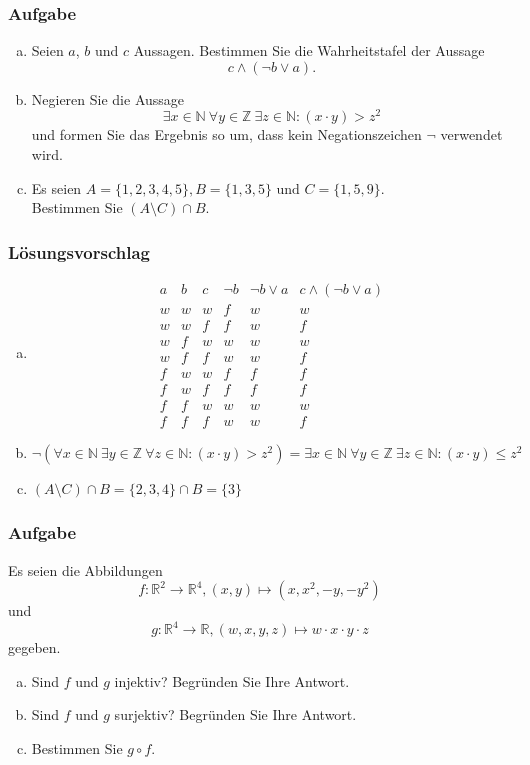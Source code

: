 \documentclass[a4paper,11pt]{scrartcl}
\newcounter{auf}
\newcommand{\Aufgabe}%
        {\addtocounter{auf}{1} \subsubsection*{\rmfamily  Aufgabe \theauf \hspace{1em}} }
\newcommand{\N}{\mathbb{N}}
\newcommand{\RR}{\mathbb{R}}
\newcommand{\Z}{\mathbb{Z}}
\begin{document}
\Aufgabe

\begin{enumerate}[a)]

\item Seien $a$, $b$ und $c$  Aussagen. 
Bestimmen Sie die Wahrheitstafel der Aussage
$$
	c \land (\neg b \lor a).
$$
\item Negieren Sie die Aussage 
$$
\exists x \in \N\ \forall y \in \Z\ \exists z \in \N: (x\cdot y) > z^2
$$
und formen Sie das Ergebnis so um, dass kein Negationszeichen $\neg$ verwendet wird.
\item Es seien $A=\{1,2,3,4,5\}, B=\{1,3,5\} \text{ und } C=\{1,5,9\}.$\\
Bestimmen Sie $(A\setminus C)\cap B$.
\end{enumerate}
%
%
\subsubsection*{Lösungsvorschlag}
\begin{enumerate}[a)]

\item $$\begin{array}{c|c|c||c|c||c}
a&b&c&\neg b&\neg b\lor a&c\land(\neg b\lor a)\\ \hline
w&w&w&f&w&w\\
w&w&f&f&w&f\\
w&f&w&w&w&w\\
w&f&f&w&w&f\\
f&w&w&f&f&f\\
f&w&f&f&f&f\\
f&f&w&w&w&w\\
f&f&f&w&w&f
\end{array}$$
\item $\neg(\forall x \in \N\ \exists y \in \Z\ \forall z \in \N: (x\cdot y) > z^2) = \exists x \in \N \ \forall y \in \Z \ \exists z \in \N: (x \cdot y) \le z^2$ 
\item $(A\setminus C)\cap B=\{2,3,4\} \cap B=\{3\}$
\end{enumerate}
%
%
%
\newpage
\Aufgabe
Es seien die Abbildungen $$f:\RR^2 \to \RR^4, (x,y) \mapsto (x, x^2, -y,-y^2)$$ und 
$$
g: \RR^4 \to \RR, (w,x,y,z) \mapsto w\cdot x \cdot y \cdot z
$$ 
gegeben. 
\begin{enumerate}[a)]
\item Sind $f$ und $g$ injektiv? Begründen Sie Ihre Antwort.
\item Sind $f$ und $g$ surjektiv? Begründen Sie Ihre Antwort.
\item Bestimmen Sie $g \circ f$. 
\end{enumerate}
%
%
\end{document}
